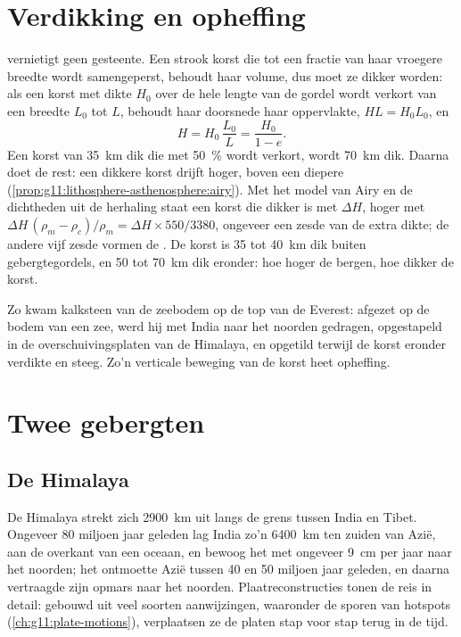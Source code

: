 \section{Verdikking en opheffing}

 vernietigt geen gesteente. Een strook korst die tot een fractie van
haar vroegere breedte wordt samengeperst, behoudt haar volume, dus moet ze dikker worden: als een korst
met dikte $H_0$ over de hele lengte van de gordel wordt verkort van een breedte $L_0$ tot $L$,
behoudt haar doorsnede haar oppervlakte, $H L = H_0 L_0$, en
\[
  H = H_0\,\frac{L_0}{L} = \frac{H_0}{1 - e}.
\]
Een korst van \qty{35}{km} dik die met \qty{50}{\percent} wordt verkort, wordt
\qty{70}{km} dik. Daarna doet  de rest: een dikkere korst drijft
hoger, boven een diepere  (\cref{prop:g11:lithosphere-asthenosphere:airy}).
Met het model van Airy en de dichtheden uit de herhaling staat een korst die dikker is met
$\Delta H$, hoger met $\Delta H\,(\rho_m - \rho_c)/\rho_m = \Delta H
\times 550/3380$, ongeveer een zesde van de extra dikte; de andere vijf
zesde vormen de . De korst is \num{35} tot \qty{40}{km} dik buiten
gebergtegordels, en 50 tot \qty{70}{km} dik eronder: hoe hoger de
bergen, hoe dikker de korst.

Zo kwam kalksteen van de zeebodem op de top van de Everest: afgezet op de
bodem van een zee, werd hij met India naar het noorden gedragen, opgestapeld in de
overschuivingsplaten van de Himalaya, en opgetild terwijl de korst eronder verdikte en
steeg. Zo'n verticale beweging van de korst heet opheffing.

\section{Twee gebergten}

\subsection{De Himalaya}

De Himalaya strekt zich \qty{2900}{km} uit langs de grens tussen India en
Tibet. Ongeveer 80 miljoen jaar geleden lag India zo'n \qty{6400}{km} ten zuiden van
Azië, aan de overkant van een oceaan, en bewoog het met ongeveer \qty{9}{cm} per jaar naar het noorden; het ontmoette
Azië tussen 40 en 50 miljoen jaar geleden, en daarna
vertraagde zijn opmars naar het noorden. Plaatreconstructies tonen de reis in detail: gebouwd uit veel
soorten aanwijzingen, waaronder de sporen van hotspots
(\cref{ch:g11:plate-motions}), verplaatsen ze de platen stap voor stap
terug in de tijd.

